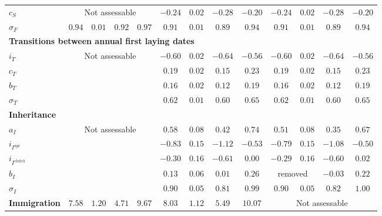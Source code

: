 \documentclass[12pt]{article}
\begin{document}
\begin{center}
\begin{scriptsize}
\begin{tabular}{lcccc|cccc|cccc}
$c_S$&\multicolumn{4}{c}{Not assessable}&$-0.24$&$0.02$&$-0.28$&$-0.20$&$-0.24$&$0.02$&$-0.28$&$-0.20$\\
$\sigma_F$&$0.94$&$0.01$&$0.92$&$0.97$&$0.91$&$0.01$&$0.89$&$0.94$&$0.91$&$0.01$&$0.89$&$0.94$\\
\multicolumn{13}{l}{\textbf{Transitions between annual first laying dates}}\\
$i_T$&\multicolumn{4}{c}{Not assessable}&$-0.60$&$0.02$&$-0.64$&$-0.56$&$-0.60$&$0.02$&$-0.64$&$-0.56$\\
$c_T$&&&&&$0.19$&$0.02$&$0.15$&$0.23$&$0.19$&$0.02$&$0.15$&$0.23$\\
$b_T$&&&&&$0.16$&$0.02$&$0.12$&$0.19$&$0.16$&$0.02$&$0.12$&$0.19$\\
$\sigma_T$&&&&&$0.62$&$0.01$&$0.60$&$0.65$&$0.62$&$0.01$&$0.60$&$0.65$\\
\multicolumn{13}{l}{\textbf{Inheritance}}\\
$a_I$&\multicolumn{4}{c}{Not assessable}&$0.58$&$0.08$&$0.42$&$0.74$&$0.51$&$0.08$&$0.35$&$0.67$\\
$i_{I^{age}}$&&&&&$-0.83$&$0.15$&$-1.12$&$-0.53$&$-0.79$&$0.15$&$-1.08$&$-0.50$\\
$i_{I^{clutch}}$&&&&&$-0.30$&$0.16$&$-0.61$&$0.00$&$-0.29$&$0.16$&$-0.60$&$0.02$\\
$b_I$&&&&&$0.13$&$0.06$&$0.01$&$0.26$&\multicolumn{2}{c}{removed}&$-0.03$&$0.22$\\
$\sigma_I$&&&&&$0.90$&$0.05$&$0.81$&$0.99$&$0.90$&$0.05$&$0.82$&$1.00$\\
\textbf{Immigration}&$7.58$&$1.20$&$4.71$&$9.67$&$8.03$&$1.12$&$5.49$&$10.07$&\multicolumn{4}{c}{Not assessable}\\
\hline
\end{tabular}
\end{scriptsize}
\end{center}


\renewcommand{\thefigure}{S\arabic{figure}}
\setcounter{figure}{0}



\clearpage
\end{document}
